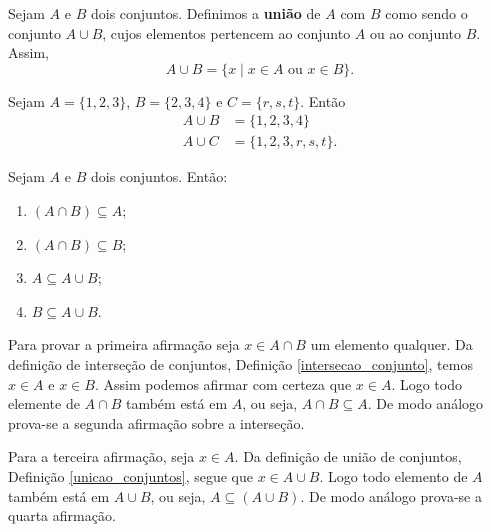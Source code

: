 \begin{definicao}\label{unicao_conjuntos}
    Sejam $A$ e $B$ dois conjuntos. Definimos a \textbf{união} de $A$ com $B$ como sendo o conjunto $A \cup B$, cujos elementos pertencem ao conjunto $A$ ou ao conjunto $B$. Assim,
    \[
        A \cup B = \{x \mid x \in A \mbox{ ou } x \in B\}.
    \]

\end{definicao}

\begin{exemplo}
    Sejam $A = \{1, 2, 3\}$, $B = \{2, 3, 4\}$ e $C = \{r, s, t\}$. Então
    \begin{align*}
        A \cup B &= \{1,2,3,4\}\\
        A \cup C &= \{1,2,3,r,s,t\}.
    \end{align*}
\end{exemplo}

\begin{proposicao} Sejam $A$ e $B$ dois conjuntos. Então:
    \begin{enumerate}[label={\roman*})]
        \item $(A \cap B) \subseteq A$;
        \item $(A \cap B) \subseteq B$;
        \item $A \subseteq A \cup B$;
        \item $B \subseteq A \cup B$.
    \end{enumerate}
\end{proposicao}
\begin{prova}
    Para provar a primeira afirmação seja $x \in A \cap B$ um elemento qualquer. Da definição de interseção de conjuntos, Definição \ref{intersecao_conjunto}, temos $x \in A$ e $x \in B$. Assim podemos afirmar com certeza que $x \in A$. Logo todo elemente de $A \cap B$ também está em $A$, ou seja, $A \cap B \subseteq A$. De modo análogo prova-se a segunda afirmação sobre a interseção.

    Para a terceira afirmação, seja $x \in A$. Da definição de união de conjuntos, Definição \ref{unicao_conjuntos}, segue que $x \in A \cup B$. Logo todo elemento de $A$ também está em $A \cup B$, ou seja, $A \subseteq (A \cup B)$. De modo análogo prova-se a quarta afirmação.
\end{prova}

